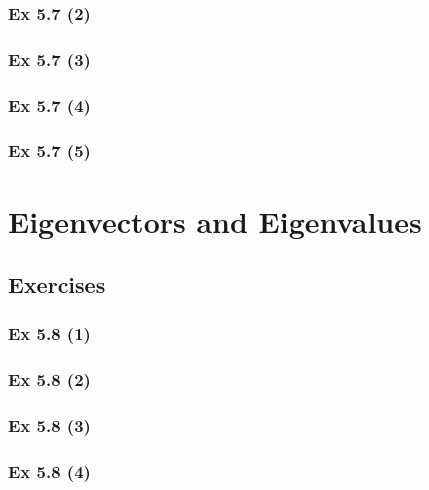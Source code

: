 \subsubsection{Ex 5.7 (2)}\label{sec:Ex_5.7.2}

\subsubsection{Ex 5.7 (3)}\label{sec:Ex_5.7.3}

\subsubsection{Ex 5.7 (4)}\label{sec:Ex_5.7.4}

\subsubsection{Ex 5.7 (5)}\label{sec:Ex_5.7.5}

\newpage		%

\section{Eigenvectors and Eigenvalues}\label{sec:5.8}
\subsection{Exercises}\label{sec:5.8_Exercises}

\subsubsection{Ex 5.8 (1)}\label{sec:Ex_5.8.1}

\subsubsection{Ex 5.8 (2)}\label{sec:Ex_5.8.2}

\subsubsection{Ex 5.8 (3)}\label{sec:Ex_5.8.3}

\subsubsection{Ex 5.8 (4)}\label{sec:Ex_5.8.4}

